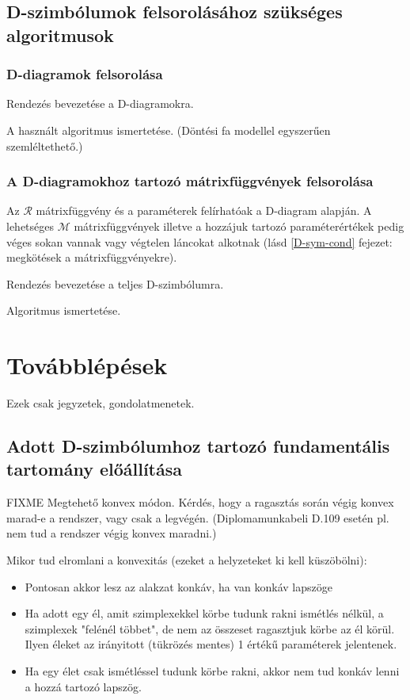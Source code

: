 \documentclass[12pt,magyar,a4paper]{article}
\begin{document}
\subsection{D-szimbólumok felsorolásához szükséges algoritmusok}
\subsubsection{D-diagramok felsorolása}
Rendezés bevezetése a D-diagramokra.

A használt algoritmus ismertetése. (Döntési fa modellel egyszerűen
szemléltethető.)

\subsubsection{A D-diagramokhoz tartozó mátrixfüggvények felsorolása}
Az $\mathcal{R}$ mátrixfüggvény és a paraméterek felírhatóak a D-diagram
alapján. A lehetséges $\mathcal{M}$ mátrixfüggvények illetve a hozzájuk tartozó
paraméterértékek pedig véges sokan vannak vagy végtelen láncokat alkotnak (lásd
\ref{D-sym-cond} fejezet: megkötések a mátrixfüggvényekre).

Rendezés bevezetése a teljes D-szimbólumra.

Algoritmus ismertetése.

\section{Továbblépések}
Ezek csak jegyzetek, gondolatmenetek.

\subsection{Adott D-szimbólumhoz tartozó fundamentális tartomány előállítása}
FIXME Megtehető konvex módon. Kérdés, hogy a ragasztás során végig konvex
marad-e a rendszer, vagy csak a legvégén. (Diplomamunkabeli D.109 esetén pl.
nem tud a rendszer végig konvex maradni.)

Mikor tud elromlani a konvexitás (ezeket a helyzeteket ki kell küszöbölni):
\begin{itemize}
  \item Pontosan akkor lesz az alakzat konkáv, ha van konkáv lapszöge
  \item Ha adott egy él, amit szimplexekkel körbe tudunk rakni ismétlés nélkül,
    a szimplexek "felénél többet", de nem az összeset ragasztjuk körbe az él
    körül. Ilyen éleket az irányitott (tükrözés mentes) 1 értékű paraméterek
    jelentenek.
  \item Ha egy élet csak ismétléssel tudunk körbe rakni, akkor nem tud konkáv
    lenni a hozzá tartozó lapszög.
\end{itemize}
\end{document}
